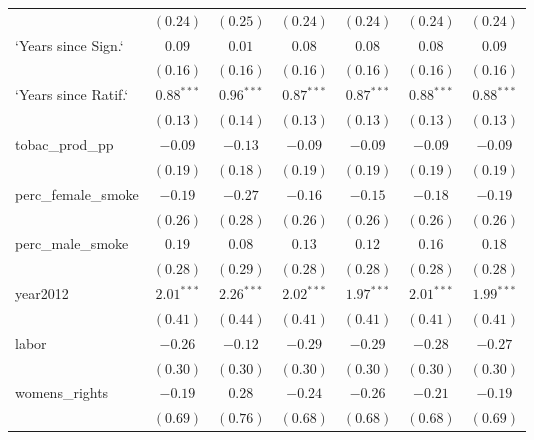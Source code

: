 \begin{table}[!h]
\begin{center}
\begin{tabular}{l c c c c c c }
                        & $(0.24)$     & $(0.25)$     & $(0.24)$     & $(0.24)$     & $(0.24)$     & $(0.24)$     \\
`Years since Sign.`     & $0.09$       & $0.01$       & $0.08$       & $0.08$       & $0.08$       & $0.09$       \\
                        & $(0.16)$     & $(0.16)$     & $(0.16)$     & $(0.16)$     & $(0.16)$     & $(0.16)$     \\
`Years since Ratif.`    & $0.88^{***}$ & $0.96^{***}$ & $0.87^{***}$ & $0.87^{***}$ & $0.88^{***}$ & $0.88^{***}$ \\
                        & $(0.13)$     & $(0.14)$     & $(0.13)$     & $(0.13)$     & $(0.13)$     & $(0.13)$     \\
tobac\_prod\_pp         & $-0.09$      & $-0.13$      & $-0.09$      & $-0.09$      & $-0.09$      & $-0.09$      \\
                        & $(0.19)$     & $(0.18)$     & $(0.19)$     & $(0.19)$     & $(0.19)$     & $(0.19)$     \\
perc\_female\_smoke     & $-0.19$      & $-0.27$      & $-0.16$      & $-0.15$      & $-0.18$      & $-0.19$      \\
                        & $(0.26)$     & $(0.28)$     & $(0.26)$     & $(0.26)$     & $(0.26)$     & $(0.26)$     \\
perc\_male\_smoke       & $0.19$       & $0.08$       & $0.13$       & $0.12$       & $0.16$       & $0.18$       \\
                        & $(0.28)$     & $(0.29)$     & $(0.28)$     & $(0.28)$     & $(0.28)$     & $(0.28)$     \\
year2012                & $2.01^{***}$ & $2.26^{***}$ & $2.02^{***}$ & $1.97^{***}$ & $2.01^{***}$ & $1.99^{***}$ \\
                        & $(0.41)$     & $(0.44)$     & $(0.41)$     & $(0.41)$     & $(0.41)$     & $(0.41)$     \\
labor                   & $-0.26$      & $-0.12$      & $-0.29$      & $-0.29$      & $-0.28$      & $-0.27$      \\
                        & $(0.30)$     & $(0.30)$     & $(0.30)$     & $(0.30)$     & $(0.30)$     & $(0.30)$     \\
womens\_rights          & $-0.19$      & $0.28$       & $-0.24$      & $-0.26$      & $-0.21$      & $-0.19$      \\
                        & $(0.69)$     & $(0.76)$     & $(0.68)$     & $(0.68)$     & $(0.68)$     & $(0.69)$     \\

\end{tabular}
\end{center}
\end{table}
